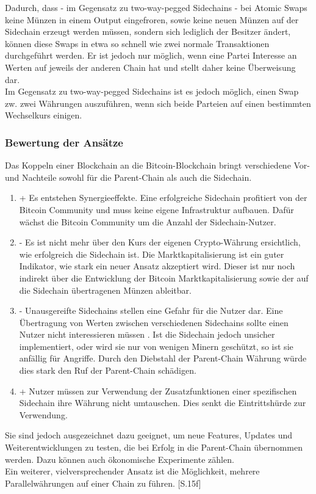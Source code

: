 Dadurch, dass - im Gegensatz zu two-way-pegged Sidechains - bei Atomic Swaps keine Münzen in einem Output \glqq eingefroren\grqq, sowie keine neuen Münzen auf der Sidechain erzeugt werden müssen, sondern sich lediglich der Besitzer ändert, können diese Swaps in etwa so schnell wie zwei normale Transaktionen durchgeführt werden. Er ist jedoch nur möglich, wenn eine Partei Interesse an Werten auf jeweils der anderen Chain hat und stellt daher keine Überweisung dar. \\
Im Gegensatz zu two-way-pegged Sidechains ist es jedoch möglich, einen Swap zw. zwei Währungen auszuführen, wenn sich beide Parteien auf einen bestimmten Wechselkurs einigen.
\subsubsection{Bewertung der Ansätze}
Das Koppeln einer Blockchain an die Bitcoin-Blockchain bringt verschiedene Vor- und Nachteile sowohl für die Parent-Chain als auch die Sidechain. 
\begin{enumerate}
	\item + Es entstehen Synergieeffekte. Eine erfolgreiche Sidechain profitiert von der Bitcoin Community und muss keine eigene Infrastruktur aufbauen. Dafür wächst die Bitcoin Community um die Anzahl der Sidechain-Nutzer.
	\item - Es ist nicht mehr über den Kurs der eigenen Crypto-Währung ersichtlich, wie erfolgreich die Sidechain ist. Die Marktkapitalisierung ist ein guter Indikator, wie stark ein neuer Ansatz akzeptiert wird. Dieser ist nur noch indirekt über die Entwicklung der Bitcoin Marktkapitalisierung sowie der auf die Sidechain übertragenen Münzen ableitbar.
	\item - Unausgereifte Sidechains stellen eine Gefahr für die Nutzer dar. Eine Übertragung von Werten zwischen verschiedenen Sidechains sollte einen Nutzer nicht interessieren müssen . Ist die Sidechain jedoch unsicher implementiert, oder wird sie nur von wenigen Minern geschützt, so ist sie anfällig für Angriffe. Durch den Diebstahl der Parent-Chain Währung würde dies stark den Ruf der Parent-Chain schädigen.
	\item + Nutzer müssen zur Verwendung der Zusatzfunktionen einer spezifischen Sidechain ihre Währung nicht umtauschen. Dies senkt die Eintrittshürde zur Verwendung.
\end{enumerate}

Sie sind jedoch ausgezeichnet dazu geeignet, um neue Features, Updates und Weiterentwicklungen zu testen, die bei Erfolg in die Parent-Chain übernommen werden. Dazu können auch ökonomische Experimente zählen. \\
Ein weiterer, vielversprechender Ansatz ist die Möglichkeit, mehrere Parallelwährungen auf einer Chain zu führen. \cite{Back.2014}[S.15f]
